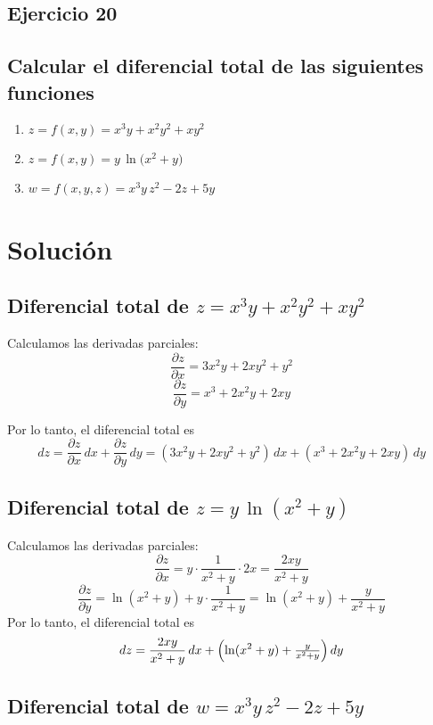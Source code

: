 \documentclass{article}
\begin{document}
\newpage

\subsection{Ejercicio 20}

\subsection*{Calcular el diferencial total de las siguientes funciones}

\begin{enumerate}
  \item \(z = f(x,y) = x^3y + x^2y^2 + xy^2\)
  \item \(z = f(x,y) = y \,\ln\bigl(x^2 + y\bigr)\)
  \item \(w = f(x,y,z) = x^3y\,z^2 - 2z + 5y\)
\end{enumerate}

\newpage
\section*{Solución}
\subsection*{Diferencial total de \(z = x^3y + x^2y^2 + xy^2\)}

Calculamos las derivadas parciales:
\[
\frac{\partial z}{\partial x}
=3x^2y + 2xy^2 + y^2
\]
\[
\frac{\partial z}{\partial y}
= x^3 + 2x^2y + 2xy
\]

Por lo tanto, el diferencial total es
{\color{teal}
\[
dz
=\frac{\partial z}{\partial x}\,dx
+\frac{\partial z}{\partial y}\,dy
=(3x^2y + 2xy^2 + y^2)\,dx
+(x^3 + 2x^2y + 2xy)\,dy
\]
}

\subsection*{Diferencial total de \(z = y\,\ln(x^2 + y)\)}

Calculamos las derivadas parciales:
\[
\frac{\partial z}{\partial x}
= y\cdot\frac{1}{x^2+y}\cdot 2x
= \frac{2xy}{x^2+y}
\]
\[
\frac{\partial z}{\partial y}
= \ln(x^2+y) + y\cdot\frac{1}{x^2+y}
= \ln(x^2+y) + \frac{y}{x^2+y}
\]
Por lo tanto, el diferencial total es
{\color{teal}
\[
dz
= \frac{2xy}{x^2+y}\,dx
+ \Bigl(\ln(x^2+y) + \tfrac{y}{x^2+y}\Bigr)\,dy
\]
}

\subsection*{Diferencial total de \(w = x^3y\,z^2 - 2z + 5y\)}
\end{document}
